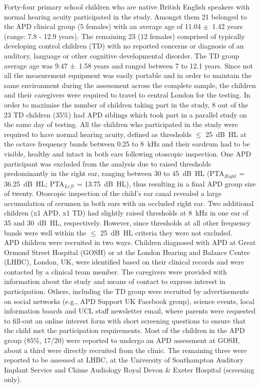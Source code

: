 \documentclass[a4paper, twoside]{templates/ociamthesis}
\begin{document}
Forty-four primary school children who are native British English speakers with normal hearing acuity participated in the study. Amongst them 21 belonged to the APD clinical group (5 females) with an average age of 11.04 \(\pm\)~1.42 years (range: 7.8 - 12.9 years). The remaining 23 (12 females) comprised of typically developing control children (TD) with no reported concerns or diagnosis of an auditory, language or other cognitive developmental disorder. The TD group average age was 9.47 ±~1.58 years and ranged between 7 to 12.1 years. Since not all the measurement equipment was easily portable and in order to maintain the same environment during the assessment across the complete sample, the children and their caregivers were required to travel to central London for the testing. In order to maximise the number of children taking part in the study, 8 out of the 23 TD children (35\%) had APD siblings which took part in a parallel study on the same day of testing. All the children who participated in the study were required to have normal hearing acuity, defined as thresholds \(\leq\) 25~dB~HL at the octave frequency bands between 0.25 to 8~kHz and their eardrum had to be visible, healthy and intact in both ears following otoscopic inspection. One APD participant was excluded from the analysis due to raised thresholds predominantly in the right ear, ranging between 30 to 45~dB~HL (PTA\(_{Right}\) = 36.25~dB~HL; PTA\(_{Left}\) = 13.75~dB~HL), thus resulting in a final APD group size of twenty. Otoscopic inspection of the child's ear canal revealed a large accumulation of cerumen in both ears with an occluded right ear. Two additional children (x1 APD, x1 TD) had slightly raised thresholds at 8~kHz in one ear of 35 and 30~dB~HL, respectively. However, since thresholds at all other frequency bands were well within the \(\leq\) 25~dB~HL criteria they were not excluded.\\

APD children were recruited in two ways. Children diagnosed with APD at Great Ormond Street Hospital (GOSH) or at the London Hearing and Balance Centre (LHBC), London, UK, were identified based on their clinical records and were contacted by a clinical team member. The caregivers were provided with information about the study and means of contact to express interest in participation. Others, including the TD group were recruited by advertisements on social networks (e.g., APD Support UK Facebook group), science events, local information boards and UCL staff newsletter email, where parents were requested to fill-out an online interest form with short screening questions to ensure that the child met the participation requirements. Most of the children in the APD group (85\%, 17/20) were reported to undergo an APD assessment at GOSH, about a third were directly recruited from the clinic. The remaining three were reported to be assessed at LHBC, at the University of Southampton Auditory Implant Service and Chime Audiology Royal Devon \& Exeter Hospital (screening only).\\
\end{document}
